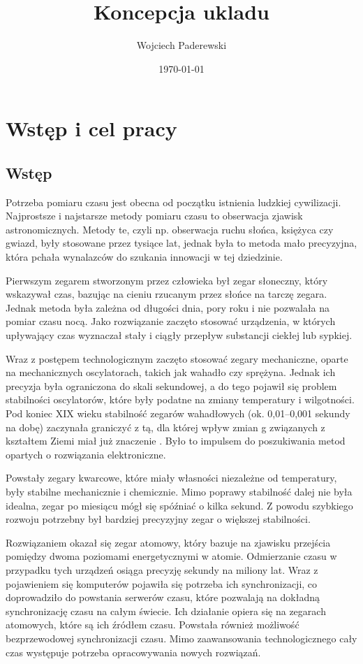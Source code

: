 \documentclass[../main.tex]{subfiles}
\author{Wojciech Paderewski}
\date{\today}
\title{Koncepcja ukladu}
\begin{document}
 \section{Wstęp i cel pracy}
 
 \subsection{Wstęp}
 Potrzeba pomiaru czasu jest obecna od początku istnienia ludzkiej cywilizacji. 
 Najprostsze i najstarsze metody pomiaru czasu to obserwacja zjawisk astronomicznych.
 Metody te, czyli np. obserwacja ruchu słońca, księżyca czy gwiazd, były stosowane przez tysiące lat,
  jednak była to metoda mało precyzyjna, która pchała wynalazców do szukania innowacji w tej dziedzinie.
 
 Pierwszym zegarem stworzonym przez człowieka był zegar słoneczny, który wskazywał czas, 
 bazując na cieniu rzucanym przez słońce na tarczę zegara. Jednak metoda była zależna od długości dnia, 
 pory roku i nie pozwalała na pomiar czasu nocą.
 Jako rozwiązanie zaczęto stosować urządzenia, w których upływający czas wyznaczał stały i ciągły przepływ 
 substancji ciekłej lub sypkiej.
 
 Wraz z postępem technologicznym zaczęto stosować zegary mechaniczne, oparte na mechanicznych oscylatorach,
  takich jak wahadło czy sprężyna. Jednak ich precyzja była ograniczona do skali sekundowej, 
  a do tego pojawił się problem stabilności oscylatorów, które były podatne na zmiany temperatury i wilgotności.
   Pod koniec XIX wieku stabilność zegarów wahadłowych (ok. 0,01–0,001 sekundy na dobę) zaczynała graniczyć z tą, 
   dla której wpływ zmian g związanych z kształtem Ziemi miał już znaczenie \cite{st:czas}.
    Było to impulsem do poszukiwania metod opartych o rozwiązania elektroniczne.
 
 Powstały zegary kwarcowe, które miały własności niezależne od temperatury, były stabilne mechanicznie i chemicznie.
 Mimo poprawy stabilność dalej nie była idealna, zegar po miesiącu mógł się spóźniać o kilka sekund. 
 Z powodu szybkiego rozwoju potrzebny był bardziej precyzyjny zegar o większej stabilności.
 
 Rozwiązaniem okazał się zegar atomowy, który bazuje na zjawisku przejścia pomiędzy dwoma poziomami energetycznymi
  w atomie. Odmierzanie czasu w przypadku tych urządzeń osiąga precyzję sekundy na miliony lat.
  Wraz z pojawieniem się komputerów pojawiła się potrzeba ich synchronizacji, co doprowadziło do powstania
   serwerów czasu, które pozwalają na dokładną synchronizację czasu na całym świecie. Ich działanie opiera się na
    zegarach atomowych, które są ich źródłem czasu.
   Powstała również możliwość bezprzewodowej synchronizacji czasu. Mimo zaawansowania technologicznego cały czas 
   występuje potrzeba opracowywania nowych rozwiązań.
 
\end{document}

